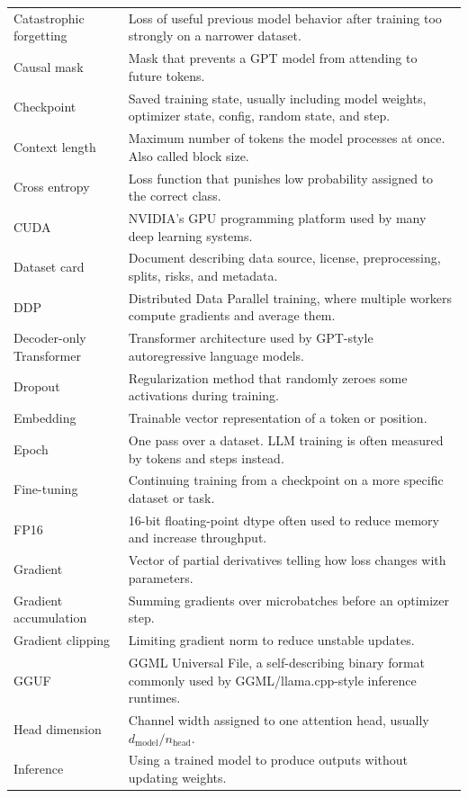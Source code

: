 \begin{longtable}{p{}p{}}
Catastrophic forgetting & Loss of useful previous model behavior after training too strongly on a narrower dataset. \\
Causal mask & Mask that prevents a GPT model from attending to future tokens. \\
Checkpoint & Saved training state, usually including model weights, optimizer state, config, random state, and step. \\
Context length & Maximum number of tokens the model processes at once. Also called block size. \\
Cross entropy & Loss function that punishes low probability assigned to the correct class. \\
CUDA & NVIDIA's GPU programming platform used by many deep learning systems. \\
Dataset card & Document describing data source, license, preprocessing, splits, risks, and metadata. \\
DDP & Distributed Data Parallel training, where multiple workers compute gradients and average them. \\
Decoder-only Transformer & Transformer architecture used by GPT-style autoregressive language models. \\
Dropout & Regularization method that randomly zeroes some activations during training. \\
Embedding & Trainable vector representation of a token or position. \\
Epoch & One pass over a dataset. LLM training is often measured by tokens and steps instead. \\
Fine-tuning & Continuing training from a checkpoint on a more specific dataset or task. \\
FP16 & 16-bit floating-point dtype often used to reduce memory and increase throughput. \\
Gradient & Vector of partial derivatives telling how loss changes with parameters. \\
Gradient accumulation & Summing gradients over microbatches before an optimizer step. \\
Gradient clipping & Limiting gradient norm to reduce unstable updates. \\
GGUF & GGML Universal File, a self-describing binary format commonly used by GGML/llama.cpp-style inference runtimes. \\
Head dimension & Channel width assigned to one attention head, usually \(d_{\text{model}}/n_{\text{head}}\). \\
Inference & Using a trained model to produce outputs without updating weights. \\

\end{longtable}
